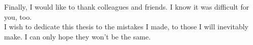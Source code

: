 Finally, I would like to thank colleagues and friends. I know it was difficult
for you, too.\\

I wish to dedicate this thesis to the mistakes I made, to those I will
inevitably make. I can only hope they won't be the same.





\endgroup
